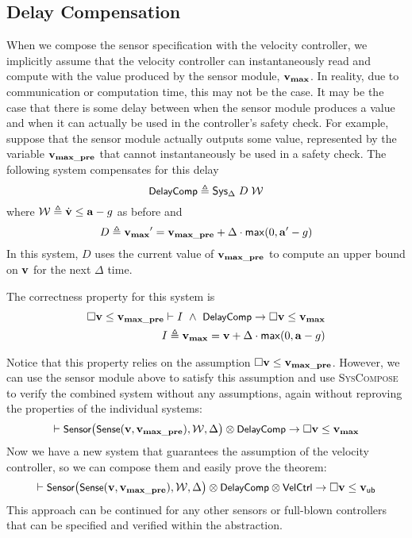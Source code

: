 \subsection{Delay Compensation}
When we compose the sensor specification with the velocity controller, we
implicitly assume that the velocity controller can instantaneously read and
compute with the value produced by the sensor module, $\mathbf{v_{max}}$.  In reality,
due to communication or computation time, this may not be the case.  It may
be the case that there is some delay between when the sensor module
produces a value and when it can actually be used in the controller's
safety check.  For example, suppose that the sensor module actually outputs
some value, represented by the variable $\mathbf{v_{max\_pre}}$ that cannot
instantaneously be used in a safety check.  The following system
compensates for this delay
\[
{\small \textsf{DelayComp}} \triangleq {\textsf{Sys}}{}_{\Delta}\;D\;\mathcal{W}
\]
where $\mathcal{W} \triangleq \dot{\mathbf{v}}\leq\mathbf{a} - g$ as before and
\[
D  \triangleq \mathbf{v_{max}}{}^\prime = \mathbf{v_{max\_pre}} + \Delta \cdot \mathsf{max}(0, \mathbf{a}{}^\prime - g)
\]
In this system, $D$ uses the current value of $\mathbf{v_{max\_pre}}$ to compute an
upper bound on $\mathbf{v}$ for the next $\Delta$ time.

The correctness property for this system is
\begin{align}
\Box{} \mathbf{v} \leq \mathbf{v_{max\_pre}} \vdash I~\wedge~{\small \textsf{DelayComp}} \rightarrow \Box{} \mathbf{v} \leq \mathbf{v_{max}} \\
I \triangleq \mathbf{v_{max}} = \mathbf{v} + \Delta \cdot \mathsf{max}(0, \mathbf{a} - g) \nonumber
\label{thm:delay-safe}
\end{align}

Notice that this property relies on the assumption $\Box{} \mathbf{v} \leq
  \mathbf{v_{max\_pre}}$.  However, we can use the sensor module above to satisfy this
assumption and use \textsc{SysCompose} to verify the combined system
without any assumptions, again without reproving the properties of the
individual systems:
\[
\vdash {\small \textsf{Sensor}}\big({\small \textsf{Sense}}(\mathbf{v},\mathbf{v_{max\_pre}}),\mathcal{W}, \Delta\big) \otimes {\small \textsf{DelayComp}} \rightarrow \Box{} \mathbf{v} \leq \mathbf{v_{max}}
\]
Now we have a new system that guarantees the assumption of the velocity
controller, so we can compose them and easily prove the theorem:
\[
\vdash {\small \textsf{Sensor}}\big({\small \textsf{Sense}}(\mathbf{v},\mathbf{v_{max\_pre}}),\mathcal{W}, \Delta\big) \otimes {\small \textsf{DelayComp}} \otimes {\small \textsf{VelCtrl}} \rightarrow \Box{} \mathbf{v} \leq \mathsf{\mathbf{v}_{ub}}
\]
This approach can be continued for any other sensors or full-blown
controllers that can be specified and verified within the \SysA{}
abstraction.

